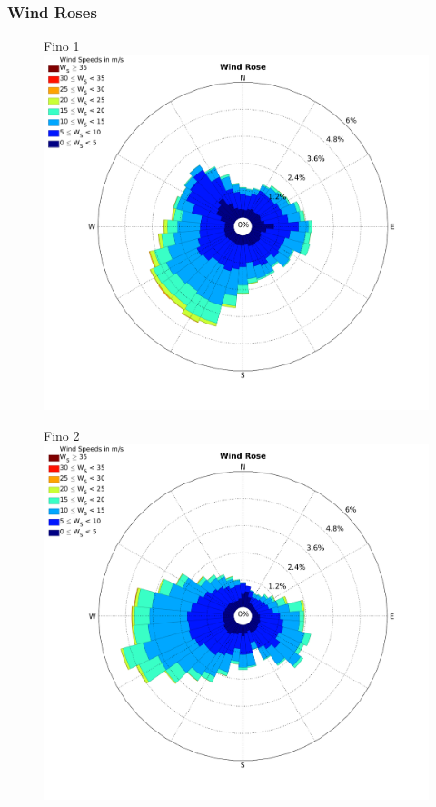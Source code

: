 \documentclass[12pt,t]{beamer}
\begin{document}
\begin{frame}
	\frametitle{Wind Roses}
\begin{figure}[htbp]
	\begin{center}
		\begin{minipage}[t]{0.45\linewidth}
			\centering
			Fino 1
			\includegraphics[width=\linewidth]{../../figures/WindRose_Fino1.png}
			\label{label 1}
		\end{minipage}
		\begin{minipage}[t]{0.45\linewidth}
			\centering
			Fino 2
			\includegraphics[width=\linewidth]{../../figures/WindRose_Fino2.png}
			\label{label 2}
		\end{minipage}
	\end{center}
\end{figure}
\end{frame}
\end{document}

